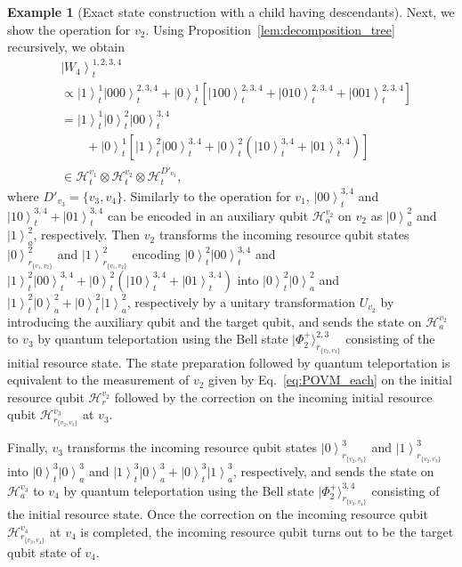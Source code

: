 \documentclass[preprintnumbers,aps,amsmath,amssymb,pra,twocolumn,showpacs,superscriptaddress,floatfix]{revtex4-1}
\def\Ket#1{\left|#1\right\rangle}
\newcommand{\ket}[1]{|{#1}\rangle}
\theoremstyle{plain}
\theoremstyle{definition}
\newtheorem{example}{Example}
\theoremstyle{remark}
\begin{document}
\begin{example}[\label{ex:1}Exact state construction with a child having descendants]
Next, we show the operation for $v_2$.
Using Proposition~\ref{lem:decomposition_tree} recursively, we obtain
\begin{align*}
&\Ket{W_4}_t^{1,2,3,4}\\
&\propto\Ket{1}_t^{1}\Ket{000}_t^{2,3,4} +\Ket{0}_t^{1}\left[\Ket{100}_t^{2,3,4}+\Ket{010}_t^{2,3,4}+\Ket{001}_t^{2,3,4}\right]\\
&=\Ket{1}_t^{1}\Ket{0}_t^{2}\Ket{00}_t^{3,4}\\
&\qquad+\Ket{0}_t^{1}\left[\Ket{1}_t^{2}\Ket{00}_t^{3,4}+\Ket{0}_t^{2}\left(\Ket{10}_t^{3,4}+\Ket{01}_t^{3,4}\right)\right]\\
&\in\mathcal{H}_t^{v_1}\otimes\mathcal{H}_t^{v_2}\otimes\mathcal{H}_t^{D'_{v_3}},
\end{align*}
where $D'_{v_3}=\{v_3, v_4\}$.
Similarly to the operation for $v_1$, $\Ket{00}_t^{3,4}$ and $\Ket{10}_t^{3,4}+\Ket{01}_t^{3,4}$ can be encoded in an auxiliary qubit $\mathcal{H}_a^{v_2}$ on $v_2$ as $\Ket{0}_a^2$ and $\Ket{1}_a^2$, respectively.
Then $v_2$ transforms the incoming resource qubit states $\Ket{0}^2_{r_{\{v_1,v_2\}}}$ and $\Ket{1}^2_{r_{\{v_1,v_2\}}}$ {encoding} $\Ket{0}_t^2\Ket{00}_t^{3,4}$ and $\Ket{1}_t^2\Ket{00}_t^{3,4}+\Ket{0}_t^2(\Ket{10}_t^{3,4}+\Ket{01}_t^{3,4})$ into $\Ket{0}_t^2\Ket{0}_a^2$ and $\Ket{1}_t^2\Ket{0}_a^2+\Ket{0}_t^2\Ket{1}_a^2$, respectively by a unitary transformation $U_{v_2}$ by introducing the auxiliary qubit and the target qubit, and sends the state on $\mathcal{H}_a^{v_2}$ to $v_3$ by quantum teleportation using the Bell state $\ket{\Phi_2^+}_{r_{\{v_2,v_3\}}}^{2,3}$  consisting of the initial resource state.
The state preparation followed by quantum teleportation is equivalent to the measurement of $v_2$ given by Eq.~\eqref{eq:POVM_each} on the initial resource qubit $\mathcal{H}_r^{v_2}$ followed by the correction on the incoming initial resource qubit $\mathcal{H}_{r_{\{v_2,v_3\}}}^{v_3}$ at $v_3$.

Finally, $v_3$ transforms the incoming resource qubit states $\Ket{0}_{r_{\{v_2,v_3\}}}^3$ and $\Ket{1}_{r_{\{v_2,v_3\}}}^3$ into $\Ket{0}_t^3\Ket{0}_a^3$ and $\Ket{1}_t^3\Ket{0}_a^3+\Ket{0}_t^3\Ket{1}_a^3$, respectively, and sends the state on $\mathcal{H}_a^{v_3}$ to $v_4$ by quantum teleportation using the Bell state $\ket{\Phi_2^+}_{r_{\{v_3,v_4\}}}^{3,4}$  consisting of the initial resource state.  Once the correction on the incoming resource qubit $\mathcal{H}_{r_{\{v_3,v_4\}}}^{v_4}$ at $v_4$ is completed, the incoming resource qubit turns out to be the target qubit state of $v_4$.

\end{example}
\end{document}
